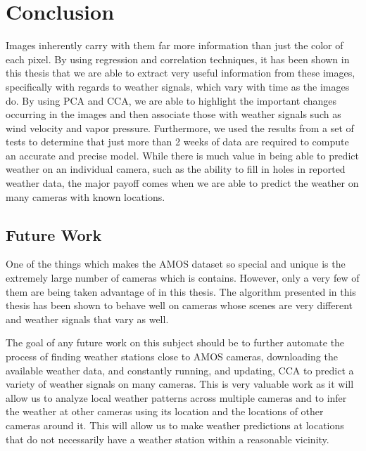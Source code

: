 \chapter{Conclusion}
\label{cpt:conclusion}
Images inherently carry with them far more information than just the color of each pixel. By using regression and correlation techniques, it has been shown in this thesis that we are able to extract very useful information from these images, specifically with regards to weather signals, which vary with time as the images do. By using PCA and CCA, we are able to highlight the important changes occurring in the images and then associate those with weather signals such as wind velocity and vapor pressure. Furthermore, we used the results from a set of tests to determine that just more than 2 weeks of data are required to compute an accurate and precise model. While there is much value in being able to predict weather on an individual camera, such as the ability to fill in holes in reported weather data, the major payoff comes when we are able to predict the weather on many cameras with known locations.

\section{Future Work}
One of the things which makes the AMOS dataset so special and unique is the extremely large number of cameras which is contains. However, only a very few of them are being taken advantage of in this thesis. The algorithm presented in this thesis has been shown to behave well on cameras whose scenes are very different and weather signals that vary as well.

The goal of any future work on this subject should be to further automate the process of finding weather stations close to AMOS cameras, downloading the available weather data, and constantly running, and updating, CCA to predict a variety of weather signals on many cameras. This is very valuable work as it will allow us to analyze local weather patterns across multiple cameras and to infer the weather at other cameras using its location and the locations of other cameras around it. This will allow us to make weather predictions at locations that do not necessarily have a weather station within a reasonable vicinity. 